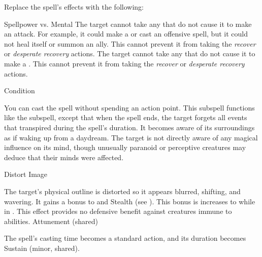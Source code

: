 Replace the spell's effects with the following:
\begin{spellcontent}
\begin{augmenteffects}
\begin{spellattack}{Spellpower vs. Mental}
\spellsuccess
The target cannot take any  that do not cause it to make an attack.
For example, it could make a  or cast an offensive spell, but it could not heal itself or summon an ally.
This cannot prevent it from taking the \textit{recover} or \textit{desperate recovery} actions.
\spellcritical
The target cannot take any  that do not cause it to make a .
This cannot prevent it from taking the \textit{recover} or \textit{desperate recovery} actions.
\end{spellattack}
\spelldur Condition
\end{augmenteffects}
\end{spellcontent}
You can cast the spell without spending an action point.
This subspell functions like the  subspell, except that when the spell ends, the target forgets all events that transpired during the spell's duration.
It becomes aware of its surroundings as if waking up from a daydream.
The target is not directly aware of any magical influence on its mind, though unusually paranoid or perceptive creatures may deduce that their minds were affected.
\begin{spellsection}{Distort Image}
\begin{spellcontent}
\begin{spelltargetinginfo}
\end{spelltargetinginfo}
\begin{spelleffects}
\spelleffect
The target's physical outline is distorted so it appears blurred, shifting, and wavering.
It gains a  bonus to  and Stealth (see ).
This bonus is increases to  while in .
This effect provides no defensive benefit against creatures immune to  abilities.
\spelldur Attunement (shared)
\end{spelleffects}
\end{spellcontent}
\begin{spellfooter}
\end{spellfooter}
\begin{spellsubcontent}
\begin{spellcantrip}
The spell's casting time becomes a standard action, and its duration becomes Sustain (minor, shared).
\end{spellcantrip}
\end{spellsubcontent}
\end{spellsection}
